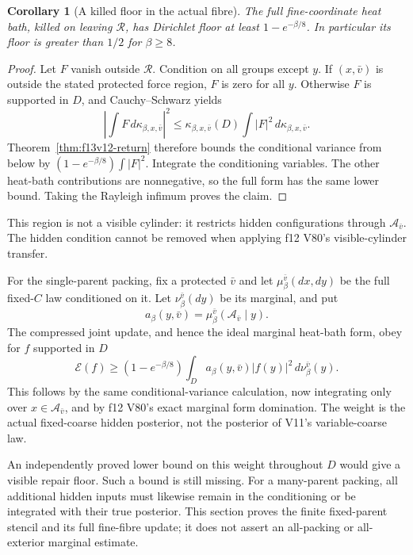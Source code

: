 \documentclass[11pt,oneside]{article}
\newtheorem{corollary}[theorem]{Corollary}
\begin{document}
\begin{corollary}[A killed floor in the actual fibre]
\label{cor:f13v12-killed}
The full fine-coordinate heat bath, killed on
leaving \(\mathcal R\), has Dirichlet floor
at least \(1-e^{-\beta/8}\). In particular its
floor is greater than \(1/2\) for \(\beta\ge8\).
\end{corollary}

\begin{proof}
Let \(F\) vanish outside \(\mathcal R\).
Condition on all groups except \(y\).
If \((x,\bar v)\) is outside the stated
protected force region, \(F\) is zero for
all \(y\). Otherwise \(F\) is supported in
\(D\), and Cauchy--Schwarz yields
\[
 \left|\int F\,d\kappa_{\beta,x,\bar v}\right|^2
 \le\kappa_{\beta,x,\bar v}(D)
                         \int|F|^2\,d\kappa_{\beta,x,\bar v}.
\]
Theorem~\ref{thm:f13v12-return} therefore bounds
the conditional variance from below by
\((1-e^{-\beta/8})\int|F|^2\).
Integrate the conditioning variables. The
other heat-bath contributions are nonnegative,
so the full form has the same lower bound.
Taking the Rayleigh infimum proves the claim.
\end{proof}

This region is not a visible cylinder: it
restricts hidden configurations through
\(\mathcal A_{\bar v}\). The hidden condition
cannot be removed when applying f12 V80's
visible-cylinder transfer.

For the single-parent packing, fix a protected
\(\bar v\) and let \(\mu_\beta^{\bar v}(dx,dy)\)
be the full fixed-\(C\) law conditioned on it.
Let \(\nu_\beta^{\bar v}(dy)\) be its marginal,
and put
\[
 a_\beta(y,\bar v)
    =\mu_\beta^{\bar v}(\mathcal A_{\bar v}\mid y).
\]
The compressed joint update, and hence the
ideal marginal heat-bath form, obey for
\(f\) supported in \(D\)
\begin{equation}\label{eq:f13v12-weighted}
 \mathcal E(f)\ge
 (1-e^{-\beta/8})
       \int_D a_\beta(y,\bar v)|f(y)|^2\,d\nu_\beta^{\bar v}(y).
\end{equation}
This follows by the same conditional-variance
calculation, now integrating only over
\(x\in\mathcal A_{\bar v}\), and by f12 V80's
exact marginal form domination. The weight
is the actual fixed-coarse hidden posterior,
not the posterior of V11's variable-coarse law.

An independently proved lower bound on this
weight throughout \(D\) would give a visible
repair floor. Such a bound is still missing.
For a many-parent packing, all additional
hidden inputs must likewise remain in the
conditioning or be integrated with their
true posterior. This section proves the
finite fixed-parent stencil and its full
fine-fibre update; it does not assert an
all-packing or all-exterior marginal estimate.
\end{document}
